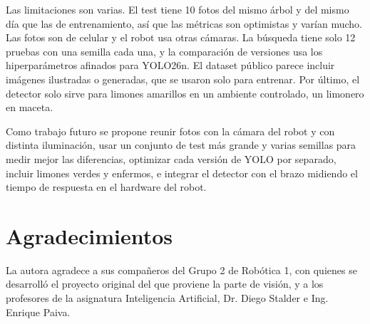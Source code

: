 \documentclass[conference]{IEEEtran}
\begin{document}
Las limitaciones son varias. El test tiene 10 fotos del mismo árbol y del mismo día que las de entrenamiento, así que las métricas son optimistas y varían mucho. Las fotos son de celular y el robot usa otras cámaras. La búsqueda tiene solo 12 pruebas con una semilla cada una, y la comparación de versiones usa los hiperparámetros afinados para YOLO26n. El dataset público parece incluir imágenes ilustradas o generadas, que se usaron solo para entrenar. Por último, el detector solo sirve para limones amarillos en un ambiente controlado, un limonero en maceta.

Como trabajo futuro se propone reunir fotos con la cámara del robot y con distinta iluminación, usar un conjunto de test más grande y varias semillas para medir mejor las diferencias, optimizar cada versión de YOLO por separado, incluir limones verdes y enfermos, e integrar el detector con el brazo midiendo el tiempo de respuesta en el hardware del robot.

\section*{Agradecimientos}
La autora agradece a sus compañeros del Grupo 2 de Robótica 1, con quienes se desarrolló el proyecto original del que proviene la parte de visión, y a los profesores de la asignatura Inteligencia Artificial, Dr. Diego Stalder e Ing. Enrique Paiva.
\end{document}
